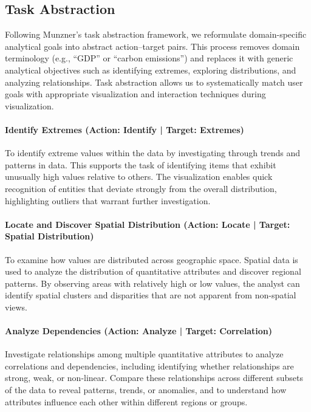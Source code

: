 \documentclass[conference]{IEEEtran}
\begin{document}
\subsection{Task Abstraction}

Following Munzner’s task abstraction framework, we reformulate domain-specific analytical goals into abstract action--target pairs. This process removes domain terminology (e.g., ``GDP'' or ``carbon emissions'') and replaces it with generic analytical objectives such as identifying extremes, exploring distributions, and analyzing relationships. Task abstraction allows us to systematically match user goals with appropriate visualization and interaction techniques during visualization.

\paragraph{Identify Extremes (Action: Identify \;|\; Target: Extremes)}
To identify extreme values within the data by investigating through trends and patterns in data. This supports the task of identifying items that exhibit unusually high values relative to others. The visualization enables quick recognition of entities that deviate strongly from the overall distribution, highlighting outliers that warrant further investigation.

\paragraph{Locate and Discover Spatial Distribution (Action: Locate \;|\; Target: Spatial Distribution)}
To examine how values are distributed across geographic space. Spatial data is used to analyze the distribution of quantitative attributes and discover regional patterns. By observing areas with relatively high or low values, the analyst can identify spatial clusters and disparities that are not apparent from non-spatial views.

\paragraph{Analyze Dependencies (Action: Analyze \;|\; Target: Correlation)}
Investigate relationships among multiple quantitative attributes to analyze correlations and dependencies, including identifying whether relationships are strong, weak, or non-linear. Compare these relationships across different subsets of the data to reveal patterns, trends, or anomalies, and to understand how attributes influence each other within different regions or groups.
\end{document}
